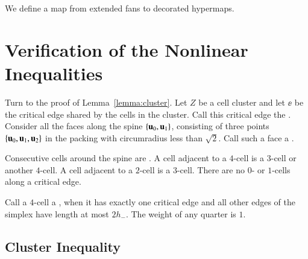 We define a map from extended fans to decorated
hypermaps.



\chapter{Verification of the Nonlinear  Inequalities}

Turn to the proof of Lemma~\ref{lemma:cluster}.  Let $Z$ be a cell
cluster and let $\ee$ be the critical edge shared by the cells in the
cluster.  Call this critical edge the .  Consider all
the faces along the spine $\{ {\mathbf u}_0, {\mathbf u}_1\}$, consisting of three
points $\{ {\mathbf u}_0, {\mathbf u}_1, {\mathbf u}_2\}$ in the packing with circumradius less
than $\sqrt2$.  Call such a face a . 

Consecutive cells around the spine are .  A cell
adjacent to a $4$-cell is a $3$-cell or another $4$-cell.  A cell
adjacent to a $2$-cell is a $3$-cell.  There are no $0$- or $1$-cells
along a critical edge.   %

Call a $4$-cell a , when it has exactly one critical
edge and all other edges of the simplex have length at most $2 h_-$.
The weight of any quarter is $1$.

\section{Cluster Inequality}

%


